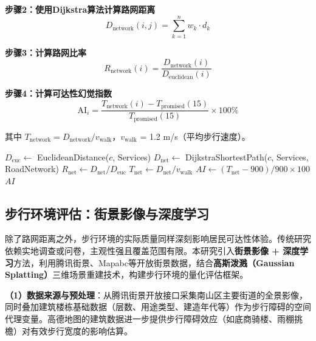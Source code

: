 \documentclass[10pt,conference]{IEEEtran}
\begin{document}
\textbf{步骤2：使用Dijkstra算法计算路网距离}
\begin{equation}
    D_{\text{network}}(i,j) = \sum_{k=1}^{n} w_k \cdot d_k
\end{equation}

\textbf{步骤3：计算路网比率}
\begin{equation}
    R_{\text{network}}(i) = \frac{D_{\text{network}}(i)}{D_{\text{euclidean}}(i)}
\end{equation}

\textbf{步骤4：计算可达性幻觉指数}
\begin{equation}
    \text{AI}_i = \frac{T_{\text{network}}(i) - T_{\text{promised}}(15)}{T_{\text{promised}}(15)} \times 100\%
\end{equation}

其中 $T_{\text{network}} = D_{\text{network}} / v_{\text{walk}}$，$v_{\text{walk}}$ = 1.2 m/s（平均步行速度）。

\begin{algorithm}
\caption{基于路网的可达性分析}
\begin{algorithmic}[1]
        \State $D_{\text{euc}} \gets$ EuclideanDistance($c$, Services)
        \State $D_{\text{net}} \gets$ DijkstraShortestPath($c$, Services, RoadNetwork)
        \State $R_{\text{net}} \gets D_{\text{net}} / D_{\text{euc}}$
        \State $T_{\text{net}} \gets D_{\text{net}} / v_{\text{walk}}$
        \State $AI \gets (T_{\text{net}} - 900) / 900 \times 100$
    \EndFor
    \State \Return $AI$
\EndProcedure
\end{algorithmic}
\end{algorithm}

\subsection{步行环境评估：街景影像与深度学习}
\label{sec:streetview}

除了路网距离之外，步行环境的实际质量同样深刻影响居民可达性体验。传统研究依赖实地调查或问卷，主观性强且覆盖范围有限。本研究引入\textbf{街景影像 + 深度学习}方法，利用腾讯街景、Mapabc等开放街景数据，结合\textbf{高斯泼溅（Gaussian Splatting）}三维场景重建技术，构建步行环境的量化评估框架。

\textbf{（1）数据来源与预处理}：从腾讯街景开放接口采集南山区主要街道的全景影像，同时叠加建筑楼栋基础数据（层数、用途类型、建造年代等）作为步行障碍的空间代理变量。高德地图的建筑数据进一步提供步行障碍效应（如底商骑楼、雨棚挑檐）对有效步行宽度的影响估算。
\end{document}
